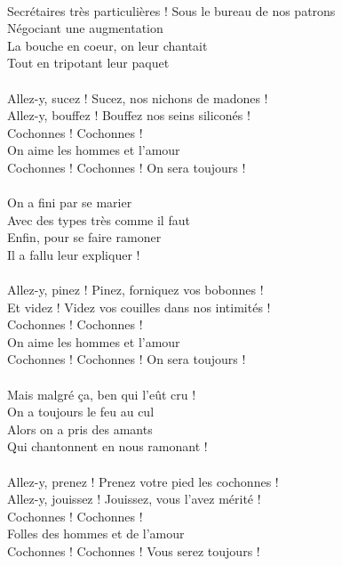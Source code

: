 \\Secrétaires très particulières !
\breakpage
Sous le bureau de nos patrons
\\Négociant une augmentation
\\La bouche en coeur, on leur chantait
\\Tout en tripotant leur paquet
\\\\Allez-y, sucez ! Sucez, nos nichons de madones !
\\Allez-y, bouffez ! Bouffez nos seins siliconés !
\\Cochonnes ! Cochonnes !
\\On aime les hommes et l'amour
\\Cochonnes ! Cochonnes ! On sera toujours !
\\\\On a fini par se marier
\\Avec des types très comme il faut
\\Enfin, pour se faire ramoner
\\Il a fallu leur expliquer !
\\\\Allez-y, pinez ! Pinez, forniquez vos bobonnes !
\\Et videz ! Videz vos couilles dans nos intimités !
\\Cochonnes ! Cochonnes !
\\On aime les hommes et l'amour
\\Cochonnes ! Cochonnes ! On sera toujours !
\\\\Mais malgré ça, ben qui l'eût cru !
\\On a toujours le feu au cul
\\Alors on a pris des amants
\\Qui chantonnent en nous ramonant !
\\\\Allez-y, prenez ! Prenez votre pied les cochonnes !
\\Allez-y, jouissez ! Jouissez, vous l'avez mérité !
\\Cochonnes ! Cochonnes !
\\Folles des hommes et de l'amour
\\Cochonnes ! Cochonnes ! Vous serez toujours !



\breakpage